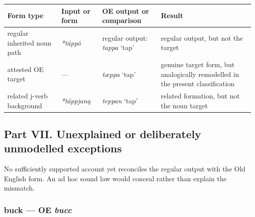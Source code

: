 \documentclass[
  british,
  a4paper,
]{article}
\newcounter{none} %
\begin{document}
{\def\LTcaptype{none} %
\begin{longtable}[]{@{}
  >{\raggedright\arraybackslash}p{}
  >{\raggedright\arraybackslash}p{}
  >{\raggedright\arraybackslash}p{}
  >{\raggedright\arraybackslash}p{}@{}}
\toprule\noalign{}
\begin{minipage}[b]{\linewidth}\raggedright
Form type
\end{minipage} & \begin{minipage}[b]{\linewidth}\raggedright
Input or form
\end{minipage} & \begin{minipage}[b]{\linewidth}\raggedright
OE output or comparison
\end{minipage} & \begin{minipage}[b]{\linewidth}\raggedright
Result
\end{minipage} \\
\midrule\noalign{}
\endhead
\bottomrule\noalign{}
\endlastfoot
regular inherited noun path & {\emph{*táppô}} & regular output:
{\emph{tappa}} `tap' & regular output, but not the target \\
attested OE target & --- & {\emph{tæppa}} `tap' & genuine target form,
but analogically remodelled in the present classification \\
related j-verb background & {\emph{*táppjaną}} & {\emph{teppan}} `tap' &
related formation, but not the noun target \\
\end{longtable}
}

\clearpage

\subsection{Part VII. Unexplained or deliberately unmodelled
exceptions}\label{part-vii.-unexplained-or-deliberately-unmodelled-exceptions}

No sufficiently supported account yet reconciles the regular output with
the Old English form. An ad hoc sound law would conceal rather than
explain the mismatch.

\subsubsection{\texorpdfstring{buck --- OE
\emph{bucc}}{buck --- OE bucc}}\label{buck-oe-bucc}
\end{document}
